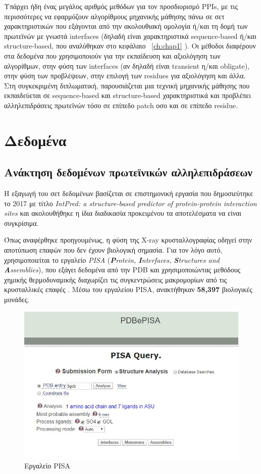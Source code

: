 \medskip
Υπάρχει ήδη ένας μεγάλος αριθμός μεθόδων για τον προσδιορισμό PPIs, με τις περισσότερες να εφαρμόζουν αλγορίθμους μηχανικής μάθησης πάνω σε σετ χαρακτηριστικών που εξάγονται από την ακολουθιακή ομολογία ή/και τη δομή των πρωτεϊνών με γνωστά interfaces (δηλαδή είναι χαρακτηριστικά sequence-based ή/και structure-based, που αναλύθηκαν στο κεφάλαιο ~\ref{ch:chap1} ). Οι μέθοδοι διαφέρουν στα δεδομένα που χρησιμοποιούν για την εκπαίδευση και αξιολόγηση των αλγορίθμων, στην φύση των interfaces (αν δηλαδή είναι transient η/και obligate), στην φύση των προβλέψεων, στην επιλογή των residues για αξιολόγηση και άλλα. Στη συγκεκριμένη διπλωματική, παρουσιάζεται μια τεχνική μηχανικής μάθησης που εκπαιδεύεται σε sequence-based και structure-based χαρακτηριστικά και προβλέπει αλληλεπιδράσεις πρωτεϊνών τόσο σε επίπεδο patch οσο και σε επίπεδο residue. 

\section{Δεδομένα} \label{data}
\subsection{Ανάκτηση δεδομένων πρωτεϊνικών αλληλεπιδράσεων}

Η εξαγωγή του σετ δεδομένων βασίζεται σε επιστημονική εργασία που δημοσιεύτηκε το 2017 με τίτλο \textit{IntPred: a structure-based predictor of protein-protein interaction sites} \cite{Northey2017} και ακολουθήθηκε η ίδια διαδικασία προκειμένου τα αποτελέσματα να είναι συγκρίσιμα.

\medskip
Όπως αναφέρθηκε προηγουμένως, η φύση της X-ray κρυσταλλογραφίας οδηγεί στην αποτύπωση επαφών που δεν έχουν βιολογική σημασία. Για τον λόγο αυτό, χρησιμοποιείται το εργαλείο \textit{PISA} (\textit{\textbf{P}rotein, \textbf{I}nterfaces, \textbf{S}tructures and \textbf{A}ssemblies}), που εξάγει δεδομένα από την PDB και χρησιμοποιώντας μεθόδους χημικής θερμοδυναμικής διαχωρίζει τις συγκεντρώσεις μακρομορίων από τις κρυσταλλικές επαφές \cite{Krissinel2007}. Μέσω του εργαλείου PISA, ανακτήθηκαν \textbf{58,397} βιολογικές μονάδες.

\medskip
\begin{figure}[h]
  \centering
  \includegraphics[scale=0.7]{images/PISA.JPG}
  \caption{Εργαλείο PISA}
  \label{fig:PISA}
\end{figure}


